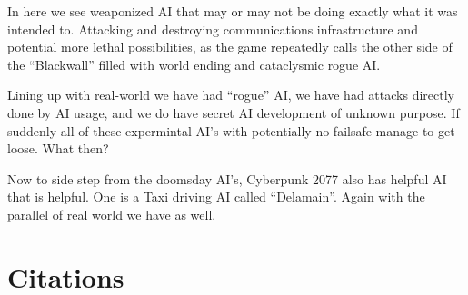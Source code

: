\documentclass{article}%
\begin{document}
In here we see weaponized AI that may or may not be doing exactly what it was 
intended to. Attacking and destroying communications infrastructure and potential more 
lethal possibilities, as the game repeatedly calls the other side of the “Blackwall” filled with 
world ending and cataclysmic rogue AI.

Lining up with real-world we have had “rogue” AI, we have had attacks directly done 
by AI usage, and we do have secret AI development of unknown purpose. If suddenly all of 
these expermintal AI’s with potentially no failsafe manage to get loose. What then?

Now to side step from the doomsday AI’s, Cyberpunk 2077 also has helpful AI that is 
helpful. One is a Taxi driving AI called “Delamain”. Again with the parallel of real world we 
have as well. 

\section{Citations}


\end{document}
